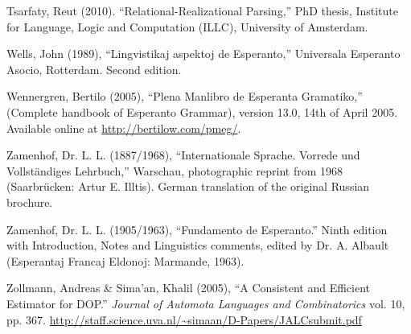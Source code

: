 \documentclass[10pt,a4paper]{article}
\begin{document}
\begin{description*}
\item[Tsarfaty,] Reut (2010). ``Relational-Realizational Parsing,'' PhD thesis,
Institute for Language, Logic and Computation (ILLC), University of Amsterdam.

\item[Wells,] John (1989), ``Lingvistikaj aspektoj de Esperanto,'' Universala
Esperanto Asocio, Rotterdam. Second edition.

\item[Wennergren,] Bertilo (2005), ``Plena Manlibro de Esperanta Gramatiko,''
(Complete handbook of Esperanto Grammar), version 13.0, 14th of April 2005.
Available online at \url{http://bertilow.com/pmeg/}.

\item[Zamenhof,] Dr. L. L. (1887/1968), ``Internationale Sprache. Vorrede und
Vollst\"andiges Lehrbuch,'' Warschau, photographic reprint from 1968
(Saarbr\"ucken: Artur E. Illtis). German translation of the original Russian
brochure.

\item[Zamenhof,] Dr. L. L. (1905/1963), ``Fundamento de Esperanto.'' Ninth
edition with Introduction, Notes and Linguistics comments, edited by Dr. A.
Albault (Esperantaj Francaj Eldonoj: Marmande, 1963).

\item[Zollmann,] Andreas \& Sima'an, Khalil (2005), ``A Consistent and Efficient
Estimator for DOP.''  {\em Journal of Automota Languages and Combinatorics} vol.
10, pp. 367.  \url{http://staff.science.uva.nl/~simaan/D-Papers/JALCsubmit.pdf}

\end{description*}
\end{document}
